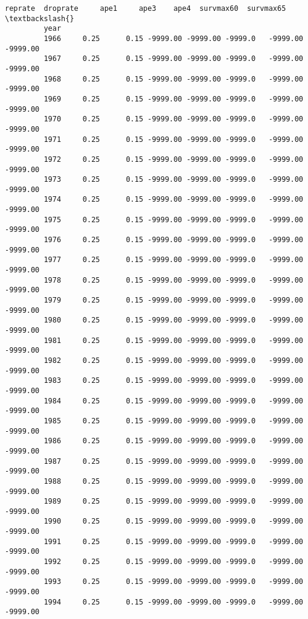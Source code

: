 \documentclass[11pt]{article}
\begin{document}
\begin{Verbatim}[commandchars=\\\{\}]
               reprate  droprate     ape1     ape3    ape4  survmax60  survmax65  \textbackslash{}
         year                                                                      
         1966     0.25      0.15 -9999.00 -9999.00 -9999.0   -9999.00   -9999.00   
         1967     0.25      0.15 -9999.00 -9999.00 -9999.0   -9999.00   -9999.00   
         1968     0.25      0.15 -9999.00 -9999.00 -9999.0   -9999.00   -9999.00   
         1969     0.25      0.15 -9999.00 -9999.00 -9999.0   -9999.00   -9999.00   
         1970     0.25      0.15 -9999.00 -9999.00 -9999.0   -9999.00   -9999.00   
         1971     0.25      0.15 -9999.00 -9999.00 -9999.0   -9999.00   -9999.00   
         1972     0.25      0.15 -9999.00 -9999.00 -9999.0   -9999.00   -9999.00   
         1973     0.25      0.15 -9999.00 -9999.00 -9999.0   -9999.00   -9999.00   
         1974     0.25      0.15 -9999.00 -9999.00 -9999.0   -9999.00   -9999.00   
         1975     0.25      0.15 -9999.00 -9999.00 -9999.0   -9999.00   -9999.00   
         1976     0.25      0.15 -9999.00 -9999.00 -9999.0   -9999.00   -9999.00   
         1977     0.25      0.15 -9999.00 -9999.00 -9999.0   -9999.00   -9999.00   
         1978     0.25      0.15 -9999.00 -9999.00 -9999.0   -9999.00   -9999.00   
         1979     0.25      0.15 -9999.00 -9999.00 -9999.0   -9999.00   -9999.00   
         1980     0.25      0.15 -9999.00 -9999.00 -9999.0   -9999.00   -9999.00   
         1981     0.25      0.15 -9999.00 -9999.00 -9999.0   -9999.00   -9999.00   
         1982     0.25      0.15 -9999.00 -9999.00 -9999.0   -9999.00   -9999.00   
         1983     0.25      0.15 -9999.00 -9999.00 -9999.0   -9999.00   -9999.00   
         1984     0.25      0.15 -9999.00 -9999.00 -9999.0   -9999.00   -9999.00   
         1985     0.25      0.15 -9999.00 -9999.00 -9999.0   -9999.00   -9999.00   
         1986     0.25      0.15 -9999.00 -9999.00 -9999.0   -9999.00   -9999.00   
         1987     0.25      0.15 -9999.00 -9999.00 -9999.0   -9999.00   -9999.00   
         1988     0.25      0.15 -9999.00 -9999.00 -9999.0   -9999.00   -9999.00   
         1989     0.25      0.15 -9999.00 -9999.00 -9999.0   -9999.00   -9999.00   
         1990     0.25      0.15 -9999.00 -9999.00 -9999.0   -9999.00   -9999.00   
         1991     0.25      0.15 -9999.00 -9999.00 -9999.0   -9999.00   -9999.00   
         1992     0.25      0.15 -9999.00 -9999.00 -9999.0   -9999.00   -9999.00   
         1993     0.25      0.15 -9999.00 -9999.00 -9999.0   -9999.00   -9999.00   
         1994     0.25      0.15 -9999.00 -9999.00 -9999.0   -9999.00   -9999.00   

\end{Verbatim}
\end{document}
